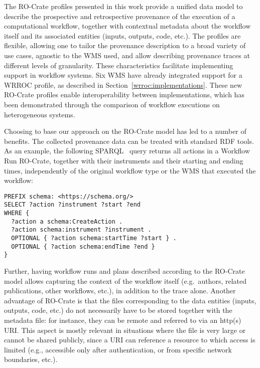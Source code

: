 The RO-Crate profiles presented in this work provide a unified data model to describe the prospective and retrospective provenance of the execution of a computational workflow, together with contextual metadata about the workflow itself and its associated entities (inputs, outputs, code, etc.).
The profiles are flexible, allowing one to tailor the provenance description to a broad variety of use cases, agnostic to the WMS used, and allow describing provenance traces at different levels of granularity.
These characteristics facilitate implementing support in workflow systems. Six WMS have already integrated support for a WRROC profile, as described in Section~\ref{wrroc:implementations}. These new RO-Crate profiles enable interoperability between implementations, which has been demonstrated through the comparison of workflow executions on heterogeneous systems.

Choosing to base our approach on the RO-Crate model has led to a number of
benefits. The collected provenance data can be treated with standard RDF tools. As an example, the following SPARQL~\cite{sparql11-overview} query returns all actions in a Workflow Run RO-Crate, together with their instruments and their starting and ending times, independently of the original workflow type or the WMS that executed the workflow:
%
\begin{verbatim}
PREFIX schema: <https://schema.org/>
SELECT ?action ?instrument ?start ?end
WHERE {
  ?action a schema:CreateAction .
  ?action schema:instrument ?instrument .
  OPTIONAL { ?action schema:startTime ?start } .
  OPTIONAL { ?action schema:endTime ?end }
}
\end{verbatim}
%
Further, having workflow runs and plans described according to the RO-Crate model allows capturing the context of the workflow itself (e.g.~authors, related publications, other workflows, etc.), in addition to the trace alone.
%
Another advantage of RO-Crate is that the files corresponding to the data entities (inputs, outputs, code, etc.) do not necessarily have to be stored together with the metadata file: for instance, they can be remote and referred to via an http(s) URI. This aspect is mostly relevant in situations where the file is very large or cannot be shared publicly, since a URI can reference a resource to which access is limited (e.g., accessible only after authentication, or from specific network boundaries, etc.).


